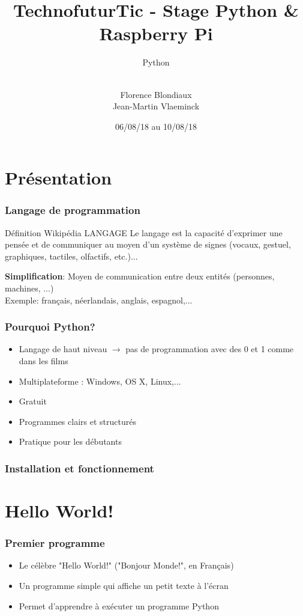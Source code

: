 \documentclass[handout]{beamer}
\title[Stage Python]{TechnofuturTic - Stage Python \& Raspberry Pi} %
\subtitle{Python}
\author[] {\\Florence Blondiaux \\ Jean-Martin Vlaeminck} %
\institute[] %
{
	Université Catholique de Louvain \\ %
	\medskip
	
}
\date{06/08/18 au 10/08/18}
\begin{document}
\begin{frame}
\titlepage %
\end{frame}




\section{Présentation}

\begin{frame}
\frametitle{Langage de programmation}
    \begin{block}{Définition Wikipédia LANGAGE}
    Le langage est la capacité d'exprimer une pensée et de communiquer au moyen d'un système de signes (vocaux, gestuel, graphiques, tactiles, olfactifs, etc.)...
    \end{block}
    \textbf{Simplification}: Moyen de communication entre deux entités (personnes, machines, ...)\\
    Exemple: français, néerlandais, anglais, espagnol,...
\end{frame}

\begin{frame}
\frametitle{Pourquoi Python?}
    \begin{itemize}
    \item Langage de haut niveau $\rightarrow$ pas de programmation avec des 0 et 1 comme dans les films
    \item Multiplateforme : Windows, OS X, Linux,...
    \item Gratuit
    \item Programmes clairs et structurés
    \item Pratique pour les débutants
    \end{itemize}
\end{frame}

\begin{frame}
\frametitle{Installation et fonctionnement}
\end{frame}

\section{Hello World!}

\begin{frame}
\frametitle{Premier programme}
    \begin{itemize}
    \item Le célèbre "Hello World!" ("Bonjour Monde!", en Français)
    \item Un programme simple qui affiche un petit texte à l'écran
    \item Permet d'apprendre à exécuter un programme Python
    \end{itemize}
\end{frame}
\end{document}
